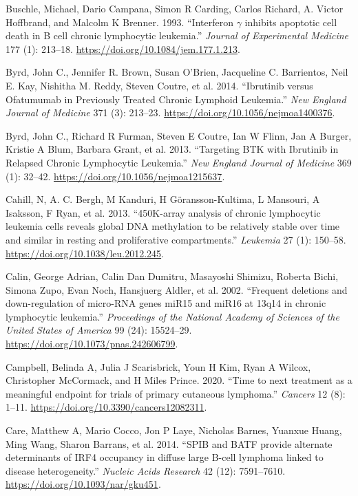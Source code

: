 \documentclass[11pt, a4paper, twosided]{book}
\newenvironment{CSLReferences}%
  {}%
  {\par}
\begin{document}
\begin{CSLReferences}{1}{0}
\leavevmode{}%
Buschle, Michael, Dario Campana, Simon R Carding, Carlos Richard, A. Victor Hoffbrand, and Malcolm K Brenner. 1993. {``{Interferon \(\gamma\) inhibits apoptotic cell death in B cell chronic lymphocytic leukemia}.''} \emph{Journal of Experimental Medicine} 177 (1): 213--18. \url{https://doi.org/10.1084/jem.177.1.213}.

\leavevmode{}%
Byrd, John C., Jennifer R. Brown, Susan O'Brien, Jacqueline C. Barrientos, Neil E. Kay, Nishitha M. Reddy, Steven Coutre, et al. 2014. {``{Ibrutinib versus Ofatumumab in Previously Treated Chronic Lymphoid Leukemia}.''} \emph{New England Journal of Medicine} 371 (3): 213--23. \url{https://doi.org/10.1056/nejmoa1400376}.

\leavevmode{}%
Byrd, John C., Richard R Furman, Steven E Coutre, Ian W Flinn, Jan A Burger, Kristie A Blum, Barbara Grant, et al. 2013. {``{Targeting BTK with Ibrutinib in Relapsed Chronic Lymphocytic Leukemia}.''} \emph{New England Journal of Medicine} 369 (1): 32--42. \url{https://doi.org/10.1056/nejmoa1215637}.

\leavevmode{}%
Cahill, N, A. C. Bergh, M Kanduri, H Göransson-Kultima, L Mansouri, A Isaksson, F Ryan, et al. 2013. {``{450K-array analysis of chronic lymphocytic leukemia cells reveals global DNA methylation to be relatively stable over time and similar in resting and proliferative compartments}.''} \emph{Leukemia} 27 (1): 150--58. \url{https://doi.org/10.1038/leu.2012.245}.

\leavevmode{}%
Calin, George Adrian, Calin Dan Dumitru, Masayoshi Shimizu, Roberta Bichi, Simona Zupo, Evan Noch, Hansjuerg Aldler, et al. 2002. {``{Frequent deletions and down-regulation of micro-RNA genes miR15 and miR16 at 13q14 in chronic lymphocytic leukemia}.''} \emph{Proceedings of the National Academy of Sciences of the United States of America} 99 (24): 15524--29. \url{https://doi.org/10.1073/pnas.242606799}.

\leavevmode{}%
Campbell, Belinda A, Julia J Scarisbrick, Youn H Kim, Ryan A Wilcox, Christopher McCormack, and H Miles Prince. 2020. {``{Time to next treatment as a meaningful endpoint for trials of primary cutaneous lymphoma}.''} \emph{Cancers} 12 (8): 1--11. \url{https://doi.org/10.3390/cancers12082311}.

\leavevmode{}%
Care, Matthew A, Mario Cocco, Jon P Laye, Nicholas Barnes, Yuanxue Huang, Ming Wang, Sharon Barrans, et al. 2014. {``{SPIB and BATF provide alternate determinants of IRF4 occupancy in diffuse large B-cell lymphoma linked to disease heterogeneity}.''} \emph{Nucleic Acids Research} 42 (12): 7591--7610. \url{https://doi.org/10.1093/nar/gku451}.


\end{CSLReferences}
\end{document}
